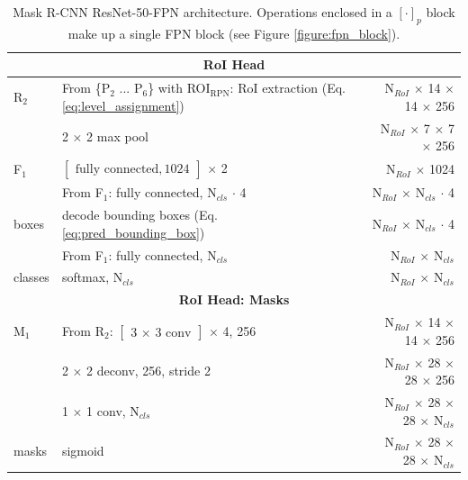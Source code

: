 {\begin{table}[h]
\begin{tabular}{llr}
\midrule
\multicolumn{3}{c}{\textbf{RoI Head}}\\
\midrule
R$_2$ & From \{P$_2$ ... P$_6$\} with ROI$_{\mathrm{RPN}}$: RoI extraction (Eq. \ref{eq:level_assignment}) & N$_{RoI}$ $\times$ 14 $\times$ 14 $\times$ 256 \\
& 2 $\times$ 2 max pool & N$_{RoI}$ $\times$ 7 $\times$ 7 $\times$ 256 \\
F$_1$ & $\begin{bmatrix}\textrm{fully connected}, 1024\end{bmatrix}$ $\times$ 2 & N$_{RoI}$ $\times$ 1024 \\
& From F$_1$: fully connected, N$_{cls}$ $\cdot$ 4 & N$_{RoI}$ $\times$ N$_{cls}$ $\cdot$ 4 \\
boxes & decode bounding boxes (Eq. \ref{eq:pred_bounding_box}) & N$_{RoI}$ $\times$ N$_{cls}$ $\cdot$ 4\\
& From F$_1$: fully connected, N$_{cls}$ & N$_{RoI}$ $\times$ N$_{cls}$ \\
classes& softmax, N$_{cls}$ & N$_{RoI}$ $\times$ N$_{cls}$ \\
\midrule
\multicolumn{3}{c}{\textbf{RoI Head: Masks}}\\
\midrule
M$_1$ & From R$_2$: $\begin{bmatrix}\textrm{3 $\times$ 3 conv} \end{bmatrix}$ $\times$ 4, 256 & N$_{RoI}$ $\times$ 14 $\times$ 14 $\times$ 256 \\
& 2 $\times$ 2 deconv, 256, stride 2 & N$_{RoI}$ $\times$ 28 $\times$ 28 $\times$ 256 \\
& 1 $\times$ 1 conv, N$_{cls}$ & N$_{RoI}$ $\times$ 28 $\times$ 28 $\times$ N$_{cls}$ \\
masks & sigmoid & N$_{RoI}$ $\times$ 28 $\times$ 28 $\times$ N$_{cls}$ \\
\bottomrule
\end{tabular}
\caption {
Mask R-CNN \cite{MaskRCNN} ResNet-50-FPN \cite{ResNet} architecture.
Operations enclosed in a $[\cdot]_p$ block make up a single FPN
block (see Figure \ref{figure:fpn_block}).
}
\label{table:maskrcnn_resnet_fpn}
\end{table}
}

